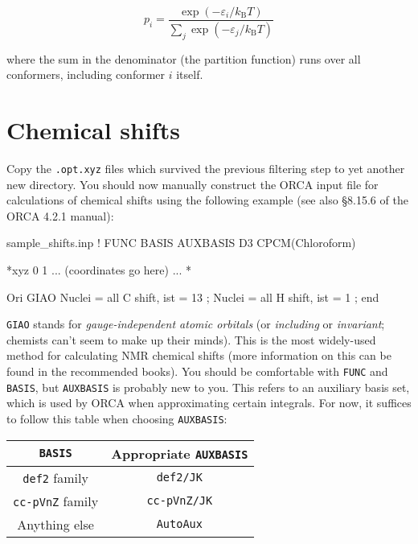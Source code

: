 \documentclass[10pt]{article}
\begin{document}
\[ p_i = \frac{\exp(-\varepsilon_i/k_\mathrm{B}T)}{\sum_j \exp(-\varepsilon_j/k_\mathrm{B}T)} \]

where the sum in the denominator (the partition function) runs over all conformers, including conformer \(i\) itself.

\newpage

\section{Chemical shifts}

Copy the \texttt{.opt.xyz} files which survived the previous filtering step to yet another new directory. You should now manually construct the ORCA input file for calculations of chemical shifts using the following example (see also \S8.15.6 of the ORCA 4.2.1 manual):

\begin{script}{sample\_shifts.inp}
! FUNC BASIS AUXBASIS D3 CPCM(Chloroform)


*xyz 0 1
... (coordinates go here) ...
*

  Ori GIAO
  Nuclei = all C { shift, ist = 13 };
  Nuclei = all H { shift, ist = 1 };
end
\end{script}

\texttt{GIAO} stands for \textit{gauge-independent atomic orbitals} (or \textit{including} or \textit{invariant}; chemists can't seem to make up their minds). This is the most widely-used method for calculating NMR chemical shifts (more information on this can be found in the recommended books). You should be comfortable with \texttt{FUNC} and \texttt{BASIS}, but \texttt{AUXBASIS} is probably new to you. This refers to an auxiliary basis set, which is used by ORCA when approximating certain integrals. For now, it suffices to follow this table when choosing \texttt{AUXBASIS}:

\begin{center}
    \begin{tabular}{cc}
        \toprule
        \texttt{BASIS} & Appropriate \texttt{AUXBASIS} \\ \midrule
        \texttt{def2} family & \texttt{def2/JK} \\
        \texttt{cc-pVnZ} family & \texttt{cc-pVnZ/JK} \\
        Anything else & \texttt{AutoAux} \\
        \bottomrule
    \end{tabular}
\end{center}
\end{document}
